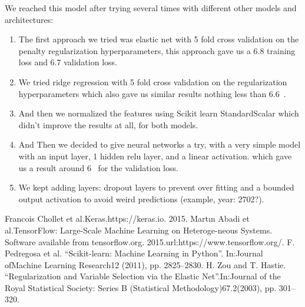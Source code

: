 \documentclass[]{homework}
\begin{document}
We reached this model after trying several times with different other models and architectures: 
\begin{enumerate}
    \item The first approach we tried was elastic net with 5 fold cross validation on the penalty regularization hyperparameters, this approach gave us a 6.8 training loss and 6.7 validation loss. 
    \item We tried ridge regression with 5 fold cross validation on the regularization hyperparameters which also gave us similar results nothing less than 6.6~. 
    \item And then we normalized the features using Scikit learn StandardScalar which didn't improve the results at all, for both models. 
    \item And Then we decided to give neural networks a try, with a very simple model with an input layer, 1 hidden relu layer, and a linear activation. which gave us a result around 6~ for the validation loss. 
    \item We kept adding layers: dropout layers to prevent over fitting and a bounded output activation to avoid weird predictions (example, year: 2702?).
\end{enumerate}

\medskip
\begin{thebibliography}{4}
Francois Chollet et al.Keras.https://keras.io. 2015.
Martın  Abadi  et  al.TensorFlow: Large-Scale Machine Learning on Heteroge-neous Systems. Software available from tensorflow.org. 2015.url:https://www.tensorflow.org/.
F.  Pedregosa  et  al.  “Scikit-learn:  Machine  Learning  in  Python”.  In:Journal ofMachine Learning Research12 (2011), pp. 2825–2830.
 H. Zou and T. Hastie. “Regularization and Variable Selection via the Elastic Net”.In:Journal of the Royal Statistical Society: Series B (Statistical Methodology)67.2(2003), pp. 301–320.
\end{thebibliography}
\end{document}
